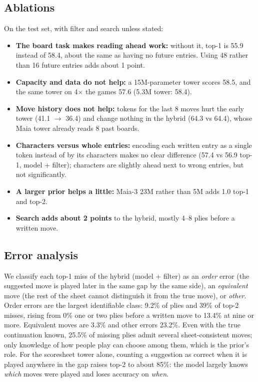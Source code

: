 \documentclass[11pt]{article}
\begin{document}
\subsection{Ablations}
\label{sec:ablations}
On the test set, with filter and search unless stated:
\begin{itemize}
  \item \textbf{The board task makes reading ahead work:} without it, top-1 is 55.9 instead of 58.4, about the same as having no future entries. Using 48 rather than 16 future entries adds about 1 point.
  \item \textbf{Capacity and data do not help:} a 15M-parameter tower scores 58.5, and the same tower on 4$\times$ the games 57.6 (5.3M tower: 58.4).
  \item \textbf{Move history does not help:} tokens for the last 8 moves hurt the early tower (41.1 $\to$ 36.4) and change nothing in the hybrid (64.3 vs 64.4), whose Maia tower already reads 8 past boards.
  \item \textbf{Characters versus whole entries:} encoding each written entry as a single token instead of by its characters makes no clear difference (57.4 vs 56.9 top-1, model + filter); characters are slightly ahead next to wrong entries, but not significantly.
  \item \textbf{A larger prior helps a little:} Maia-3 23M rather than 5M adds 1.0 top-1 and top-2.
  \item \textbf{Search adds about 2 points} to the hybrid, mostly 4--8 plies before a written move.
\end{itemize}

\subsection{Error analysis}
\label{sec:errors}
We classify each top-1 miss of the hybrid (model + filter) as an \emph{order} error (the suggested move is played later in the same gap by the same side), an \emph{equivalent} move (the rest of the sheet cannot distinguish it from the true move), or \emph{other}. Order errors are the largest identifiable class: 9.2\% of plies and 39\% of top-2 misses, rising from 0\% one or two plies before a written move to 13.4\% at nine or more. Equivalent moves are 3.3\% and other errors 23.2\%. Even with the true continuation known, 25.5\% of missing plies admit several sheet-consistent moves; only knowledge of how people play can choose among them, which is the prior's role. For the scoresheet tower alone, counting a suggestion as correct when it is played anywhere in the gap raises top-2 to about 85\%: the model largely knows \emph{which} moves were played and loses accuracy on \emph{when}.
\end{document}
